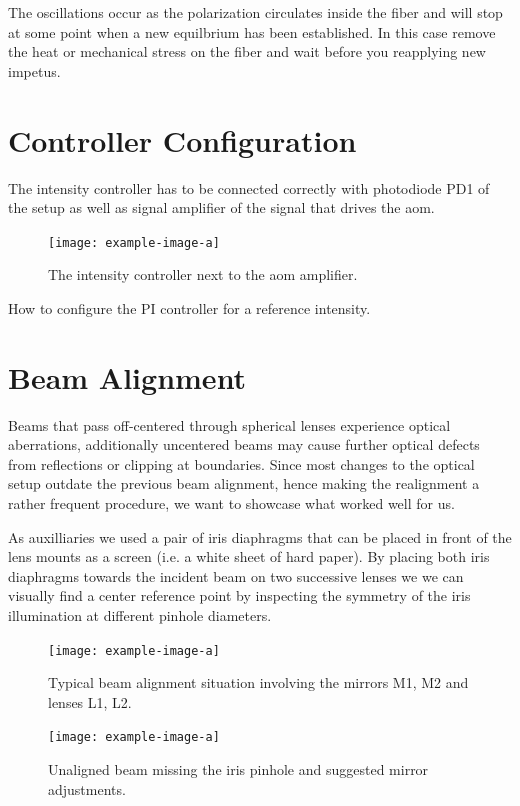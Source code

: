 The oscillations occur as the polarization circulates inside the fiber and
will stop at some point when a new equilbrium has been established. In this
case remove the heat or mechanical stress on the fiber and wait before you
reapplying new impetus.

\section{Controller Configuration}

The intensity controller has to be connected correctly with photodiode PD1
of the setup as well as signal amplifier of the signal that drives the
\gls{aom}.

\begin{figure}[ht]
  \centering
  \texttt{[image: example-image-a]}
  \caption{The intensity controller next to the \gls{aom} amplifier.}
  \label{fig:intcontrol}
\end{figure}

How to configure the PI controller for a reference intensity.

\section{Beam Alignment}

Beams that pass off-centered through spherical lenses experience optical
aberrations, additionally uncentered beams may cause further optical defects
from reflections or clipping at boundaries. Since most changes to the optical
setup outdate the previous beam alignment, hence making the realignment
a rather frequent procedure, we want to showcase what worked well for us.

As auxilliaries we used a pair of iris diaphragms that can be placed in front
of the lens mounts as a screen (i.e. a white sheet of hard paper). By placing
both iris diaphragms towards the incident beam on two successive lenses we
we can visually find a center reference point by inspecting the symmetry of
the iris illumination at different pinhole diameters.

\begin{figure}[ht]
  \centering
    \texttt{[image: example-image-a]}
    \caption{Typical beam alignment situation involving the mirrors M1, M2 and
    lenses L1, L2.}
    \label{fig:beamalign:setup}
  \endminipage
  \hfill
    \texttt{[image: example-image-a]}
    \caption{Unaligned beam missing the iris pinhole and suggested mirror
    adjustments.}
    \label{fig:beamalign:iris}
  \endminipage
  \hfill
\end{figure}


